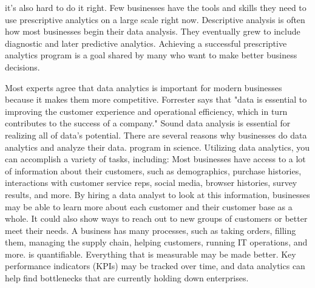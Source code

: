 \documentclass[journal]{IEEEtran}
\begin{document}
it's also hard to do it right. Few businesses have the tools and skills they need to use prescriptive analytics on a large scale right now. Descriptive analysis is often how most businesses begin their data analysis. They eventually grew to include diagnostic and later predictive analytics. Achieving a successful prescriptive analytics program is a goal shared by many who want to make better business decisions.

\par Most experts agree that data analytics is important for modern businesses because it makes them more competitive. Forrester says that "data is essential to improving the customer experience and operational efficiency, which in turn contributes to the success of a company." Sound data analysis is essential for realizing all of data's potential. There are several reasons why businesses do data analytics and analyze their data. program in science. Utilizing data analytics, you can accomplish a variety of tasks, including: Most businesses have access to a lot of information about their customers, such as demographics, purchase histories, interactions with customer service reps, social media, browser histories, survey results, and more. By hiring a data analyst to look at this information, businesses may be able to learn more about each customer and their customer base as a whole. It could also show ways to reach out to new groups of customers or better meet their needs. A business has many processes, such as taking orders, filling them, managing the supply chain, helping customers, running IT operations, and more. is quantifiable. Everything that is measurable may be made better. Key performance indicators (KPIs) may be tracked over time, and data analytics can help find bottlenecks that are currently holding down enterprises.
\end{document}
